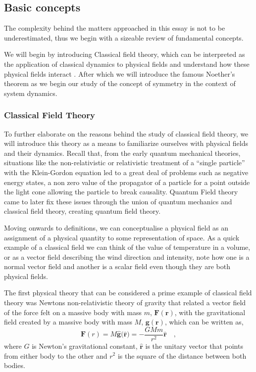 \documentclass[12pt]{article}
\begin{document}
\subsection{Basic concepts}

The complexity behind the matters approached in this essay is not to be underestimated, thus we begin with a sizeable review of fundamental concepts.

We will begin by introducing Classical field theory, which can be interpreted as the application of classical dynamics to physical fields and understand how these physical fields interact \cite{schwartz2014quantum}. After which we will introduce the famous Noether's theorem as we begin our study of the concept of symmetry in the context of system dynamics.

\subsubsection{Classical Field Theory} 

To further elaborate on the reasons behind the study of classical field theory, we will introduce this theory as a means to familiarize ourselves with physical fields and their dynamics.  
%
Recall that, from the early quantum mechanical theories, situations like the non-relativistic or relativistic treatment of a ``single particle'' with the Klein-Gordon equation led to a great deal of problems such as negative energy states, a non zero value of the propagator of a particle for a point outside the light cone allowing the particle to break causality.  
%
Quantum Field theory came to later fix these issues through the union of quantum mechanics and classical field theory, creating quantum field theory. 

Moving onwards to definitions, we can conceptualise a physical field as an assignment of a physical quantity to some representation of space. As a quick example of a classical field we can think of the value of temperature in a volume, or as a vector field describing the wind direction and intensity, note how one is a normal vector field and another is a scalar field even though they are both physical fields. 

The first physical theory that can be considered a prime example of classical field theory was Newtons non-relativistic theory of gravity that related a vector field of the force felt on a massive body with mass $m$, $\mathbf{F(r)}$, with the gravitational field created by a massive body with mass $M$, $\mathbf{g(r)}$, which can be written as,
%
\begin{equation}
\mathbf{F}(r) = M \mathbf{\hat{g}(\hat{r}})= - \frac{GMm}{r^2} \mathbf{\hat{r}} \quad , 
\end{equation}
%
where $G$ is Newton's gravitational constant, $\mathbf{\hat{r}}$ is the unitary vector that points from either body to the other and $r^2$ is the square of the distance between both bodies.
\end{document}
